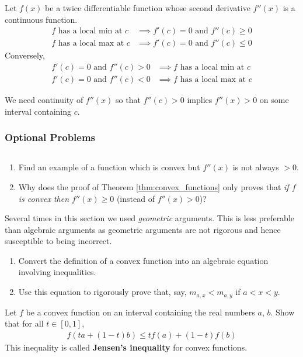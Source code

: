 \begin{theorem}
	Let $f(x)$ be a twice differentiable function whose second derivative $f''(x)$ is a continuous function.
	\begin{align*}
		f	\mbox{ has a local min at } c &\implies f'(c) = 0 \mbox{ and } f''(c) \ge 0 \\
			f	\mbox{ has a local max at } c &\implies f'(c) = 0 \mbox{ and } f''(c) \le 0
	\end{align*}
	Conversely,
	\begin{align*}
		f'(c) = 0 \mbox{ and } f''(c) > 0 & \implies f	\mbox{ has a local min at } c  \\
		f'(c) = 0 \mbox{ and } f''(c) < 0 & \implies f	\mbox{ has a local max at } c
	\end{align*}
\end{theorem}
We need continuity of $f''(x)$ so that $f''(c) > 0$ implies $f''(x)>0$ on some interval containing $c$.


\subsubsection*{Optional Problems}
\begin{exercise}$ $
	\begin{enumerate}
		\item Find an example of a function which is convex but $f''(x)$ is not always $> 0$.
		\item Why does the proof of Theorem \ref{thm:convex_functions} only proves  that {\it if $f$ is convex then $f''(x) \ge 0$} (instead of $f''(x) > 0$)?
	\end{enumerate}
\end{exercise}

\begin{exercise}
	Several times in this section we used {\it geometric} arguments. This is less preferable than algebraic arguments as geometric arguments are not rigorous and hence susceptible to being incorrect.
	\begin{enumerate}
		\item Convert the definition of a convex function into an algebraic equation involving inequalities.
		\item Use this equation to rigorously prove that, say, $m_{a,x} < m_{a,y}$ if $a < x < y$.
	\end{enumerate}
\end{exercise}

\begin{exercise}
	Let $f$ be a convex function on an interval containing the real numbers $a$, $b$. Show that for all $ t \in [0,1]$,
	\begin{align*}
		f(t a + (1-t) b) \le t f(a) + (1- t) f(b)
	\end{align*}
	This inequality is called {\bf Jensen's inequality} for convex functions.
\end{exercise}
